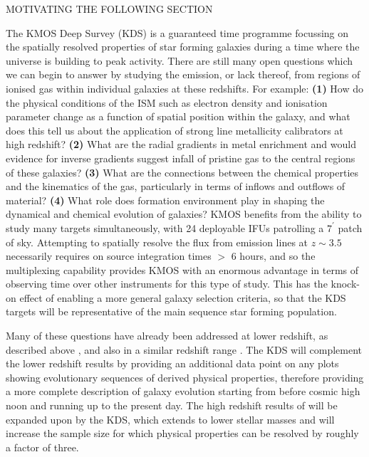 \documentclass[a4paper,fleqn,usenatbib]{mn2e}
\begin{document}
MOTIVATING THE FOLLOWING SECTION

The KMOS Deep Survey (KDS) is a guaranteed time programme focussing on the spatially resolved properties of star forming galaxies during a time where the universe is building to peak activity.
There are still many open questions which we can begin to answer by studying the emission, or lack thereof, from regions of ionised gas within individual galaxies at these redshifts.
For example: \textbf{(1)} How do the physical conditions of the ISM such as electron density and ionisation parameter change as a function of spatial position within the galaxy, and what does this tell us about the application of strong line metallicity calibrators at high redshift?
\textbf{(2)} What are the radial gradients in metal enrichment and would evidence for inverse gradients suggest infall of pristine gas to the central regions of these galaxies?
\textbf{(3)} What are the connections between the chemical properties and the kinematics of the gas, particularly in terms of inflows and outflows of material?
\textbf{(4)} What role does formation environment play in shaping the dynamical and chemical evolution of galaxies? 
KMOS benefits from the ability to study many targets simultaneously, with 24 deployable IFUs patrolling a $7^{\prime}$ patch of sky.
Attempting to spatially resolve the flux from emission lines at $z \sim 3.5$ necessarily requires on source integration times $>$ 6 hours, and so the multiplexing capability provides KMOS with an enormous advantage in terms of observing time over other instruments for this type of study.
This has the knock-on effect of enabling a more general galaxy selection criteria, so that the KDS targets will be representative of the main sequence star forming population. 

Many of these questions have already been addressed at lower redshift, as described above \citep{ForsterSchreiber2009,Wisnioski2015,Stott2016}, and also in a similar redshift range \cite{Gnerucci2011}.
The KDS will complement the lower redshift results by providing an additional data point on any plots showing evolutionary sequences of derived physical properties, therefore providing a more complete description of galaxy evolution starting from before cosmic high noon and running up to the present day.
The high redshift results of \cite{Gnerucci2011} will be expanded upon by the KDS, which extends to lower stellar masses and will increase the sample size for which physical properties can be resolved by roughly a factor of three.
\end{document}
